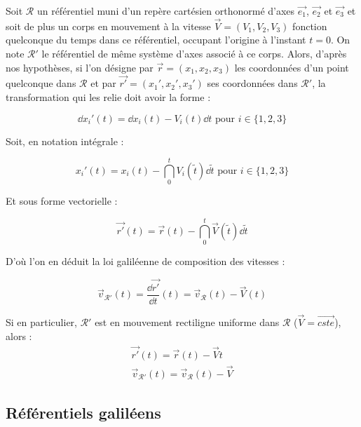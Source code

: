 Soit $\mathcal{R}$ un référentiel muni d'un repère cartésien orthonormé d'axes $\vec{e_1}$,  $\vec{e_2}$ et $\vec{e_3}$ et soit de plus un corps en mouvement à la vitesse $\vec{V} = (V_1, V_2, V_3)$ fonction quelconque du temps dans ce référentiel, occupant l'origine à l'instant $t = 0$. On note $\mathcal{R}'$ le référentiel de même système d'axes associé à ce corps. Alors, d'après nos hypothèses, si l'on désigne par $\vec{r} = (x_1, x_2, x_3)$ les coordonnées d'un point quelconque dans $\mathcal{R}$ et par $\vec{r'} = (x_1', x_2', x_3')$ ses coordonnées dans $\mathcal{R}'$, la transformation qui les relie doit avoir la forme :

\begin{equation}
\dd x_i'(t) = \dd x_i(t) -  V_i(t) \dd t \textrm{ pour } i \in \{1, 2, 3\}
\end{equation}

Soit, en notation intégrale :

\begin{equation}
x_i'(t) = x_i(t) - \dint_{0}^{t} V_i(\tilde{t}) \dd \tilde{t} \textrm{ pour } i \in \{1, 2, 3\}
\end{equation}

Et sous forme vectorielle :

\begin{equation}
\vec{r'}(t) = \vec{r}(t) - \dint_{0}^{t} \vec{V}(\tilde{t}) \dd \tilde{t}
\end{equation}

D'où l'on en déduit la loi galiléenne de composition des vitesses :

\begin{equation}
\vec{v}_{\mathcal{R'}}(t) = \frac{\dd \vec{r'}}{\dd t}(t) = \vec{v}_{\mathcal{R}}(t) - \vec{V}(t)
\end{equation}

Si en particulier, $\mathcal{R}'$ est en mouvement rectiligne uniforme dans $\mathcal{R}$ ($\vec{V} = \vec{cste}$), alors :
\begin{align}
\vec{r'}(t) = \vec{r}(t) - \vec{V} t \\
\vec{v}_{\mathcal{R'}}(t) = \vec{v}_{\mathcal{R}}(t) - \vec{V}
\end{align}

\subsection{Référentiels galiléens}

